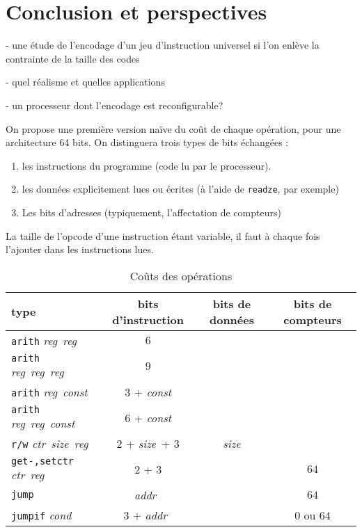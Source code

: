 \documentclass[architecture]{compas2018}
\newcommand{\reg}{\textit{reg}}
\newcommand{\const}{\textit{const}}
\newcommand{\cond}{\textit{cond}}
\newcommand{\ctr}{\textit{ctr}}
\newcommand{\size}{\textit{size}}
\newcommand{\addr}{\textit{addr}}
\begin{document}
\section{Conclusion et perspectives}

- une étude de l'encodage d'un jeu d'instruction universel si l'on enlève la contrainte de la taille des codes

- quel réalisme et quelles applications

- un processeur dont l'encodage est reconfigurable? 



\begin{table}[!h]
  \caption{Coûts des opérations}
  \label{tab:costs}
  On propose une première version naïve du coût de chaque opération, pour une architecture 64 bits.
  On distinguera trois types de bits échangées :
  \begin{enumerate}
  \item les instructions du programme (code lu par le processeur).
  \item les données explicitement lues ou écrites (à l'aide de \texttt{readze}, par exemple)
  \item Les bits d'adresses (typiquement, l'affectation de compteurs)
  \end{enumerate}
La taille de l'opcode d'une instruction étant variable, il faut à chaque fois l'ajouter dans les instructions lues.
  \begin{center}
  \begin{tabular}{|l|c|c|c|}
    \hline  
    type & bits d'instruction & bits de données & bits de compteurs \\
    \hline  
    \hline
    \texttt{arith} \reg\ \reg\ & $6$                &    &      \\
    \hline
    \texttt{arith} \reg\ \reg\ \reg\   & $9$   &    &      \\
    \hline
    \texttt{arith} \reg\ \const\       & $3$ + \const       &    &      \\
    \hline
    \texttt{arith} \reg\ \reg\ \const\ & $6$ + \const       &    &      \\
    \hline
    \texttt{r/w} \ctr\ \size\ \reg     & $2$ + \size\ + $3$ & \size           &      \\
    \hline
    \texttt{get-,setctr} \ctr\ \reg\   & $2$ + $3$          &    & $64$              \\
    \hline
    \texttt{jump}         & \addr\             &    & $64$              \\
    \hline
    \texttt{jumpif} \cond & $3$ + \addr\       &    & $0$ ou $64$       \\

\end{tabular}
\end{center}
\end{table}
\end{document}
